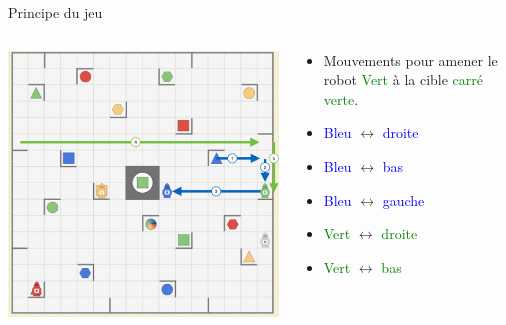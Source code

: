 \documentclass{beamer}
\begin{document}
\begin{frame}{Principe du jeu}
    \begin{columns}
        \begin{column}{0.6\textwidth}
        \vspace{\topsep}
        \includegraphics[scale=0.4]{Images/r7.png}%
        \end{column}
        
        \begin{column}{0.4\textwidth}
        \begin{itemize}
        \item Mouvements pour amener le robot \textcolor{green}{Vert} à la cible \textcolor{green}{carré verte}.
        \item \textcolor{blue}{Bleu} $\longleftrightarrow$ \textcolor{blue}{droite}
        \item \textcolor{blue}{Bleu} $\longleftrightarrow$ \textcolor{blue}{bas}
        \item \textcolor{blue}{Bleu} $\longleftrightarrow$ \textcolor{blue}{gauche}
        \item \textcolor{green}{Vert} $\longleftrightarrow$ \textcolor{green}{droite}
        \item \textcolor{green}{Vert} $\longleftrightarrow$ \textcolor{green}{bas}
        \end{itemize}
        \end{column}
    \end{columns}
\end{frame}
\end{document}
